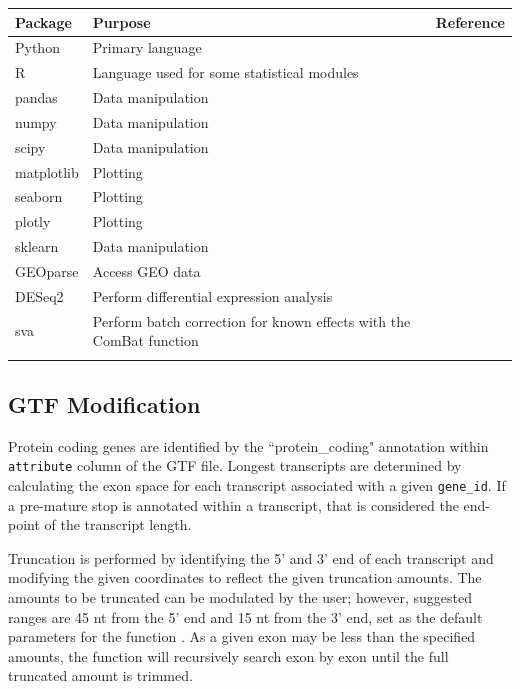 \documentclass[11pt, a4paper, oneside]{article}
\begin{document}
\begin{tabular}{p{2.4cm}p{7.5cm}p{3cm}}
 \textbf{Package} & \textbf{Purpose} & \textbf{Reference} \\
 \hline
 Python & Primary language & \\
 \hline
 R & Language used for some statistical modules & \\
 \hline
 pandas & Data manipulation & \cite{pandas} \\
 \hline
 numpy & Data manipulation & \cite{numpy1, numpy2} \\
 \hline
 scipy & Data manipulation & \cite{scipy} \\
 \hline
 matplotlib & Plotting & \cite{matplotlib} \\
 \hline
 seaborn & Plotting & \cite{seaborn} \\
 \hline
 plotly & Plotting & \cite{plotly} \\
 \hline
 sklearn & Data manipulation & \cite{sklearn} \\
 \hline
 GEOparse & Access GEO data & \cite{geoparse} \\
 \hline
 DESeq2 & Perform differential expression analysis & \cite{deseq2} \\
 \hline
 sva & Perform batch correction for known effects with the ComBat function & \cite{sva} \\
 \label{Tab:software_plot}
 \end{tabular}
 \newline

\subsection{GTF Modification}
Protein coding genes are identified by the ``protein\_coding" annotation within \texttt{attribute} column of the GTF file.
Longest transcripts are determined by calculating the exon space for each transcript associated with a given \texttt{gene\_id}. If a pre-mature stop is annotated within a transcript, that is considered the end-point of the transcript length. \par
Truncation is performed by identifying the 5' and 3' end of each transcript and modifying the given coordinates to reflect the given truncation amounts. The amounts to be truncated can be modulated by the user; however, suggested ranges are 45 nt from the 5' end and 15 nt from the 3' end, set as the default parameters for the function \cite{ingolia_meth}. As a given exon may be less than the specified amounts, the function will recursively search exon by exon until the full truncated amount is trimmed.
\end{document}
